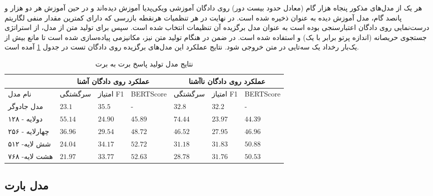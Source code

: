 هر یک از مدل‌های مذکور پنجاه هزار گام (معادل حدود بیست دور) روی دادگان آموزشی ویکی‌پدیا آموزش دیده‌اند و در حین آموزش هر دو هزار و پانصد گام، مدل آموزش دیده به عنوان 
ذخیره شده است. در نهایت  در هر تنظمیات  هرنقطه‌ بازرسی که دارای کمترین مقدار منفی لگاریتم درست‌نمایی روی دادگان اعتبارسنجی بوده است به عنوان مدل برگزیده آن تنظیمات انتخاب شده است. سپس برای تولید متن از مدل، از استراتژی
جستجوی حریصانه (اندازه پرتو برابر با یک)  و  
استفاده شده است.  در ضمن در هنگام تولید متن نیز، مکانیزمی پیاده‌سازی شده است تا مانع بیش از یک‌بار رخداد یک سه‌تایی در متن خروجی شود. 
نتایج عملکرد این مدل‌های برگزیده روی دادگان تست در جدول 
\ref{table:generation:bert2bert:beam1}
 آمده است.
\begin{table}[htb]
	\caption{ نتایج مدل تولید پاسخ برت به برت}
	\label{table:generation:bert2bert:beam1}
	\begin{tabular}{|l|l|l|l|l|l|l|}
		\hline
		& \multicolumn{3}{c|}{عملکرد روی دادگان آشنا} & \multicolumn{3}{c|}{عملکرد روی دادگان نا‌آشنا} \\ \hline
		نام مدل        & سرگشتگی     & امتیاز F1     & BERTScore     & سرگشتگی      & امتیاز F1      & BERTScore      \\ \hline
		مدل جادوگر     & $23.1$      & $35.5$        & -             & $32.8$       & $32.2$         & -              \\ \hline
		دولایه - ۱۲۸   & $55.14$     & $24.90$       & $45.89$       & $74.44$      & $23.97$        & $44.39$        \\ \hline
		چهارلایه - ۲۵۶ & $36.96$     & $29.54$       & $48.72$       & $46.52$      & $27.95$        & $46.96$        \\ \hline
		شش لایه- ۵۱۲   & $24.04$     & $34.17$       & $52.72$       & $31.18$      & $31.83$        & $50.88$        \\ \hline
		هشت لایه- ۷۶۸  & $21.97$     & $33.77$       & $52.63$       & $28.78$      & $31.76$        & $50.53$        \\ \hline
	\end{tabular}
\end{table}


\subsection{مدل بارت}

